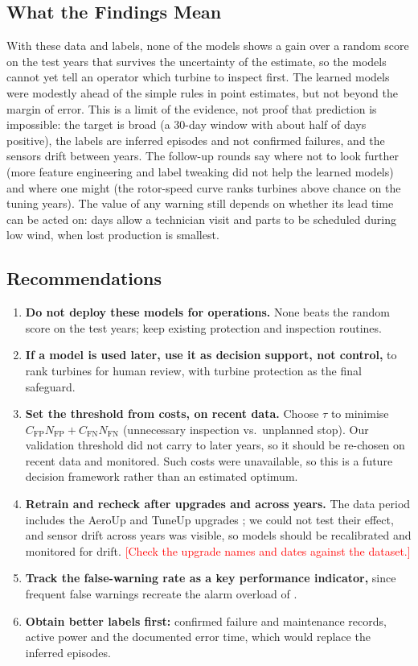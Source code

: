 \documentclass[12pt,a4paper]{article}
\newcommand{\tbc}[1]{\textcolor{red}{[#1]}}
\begin{document}
	\subsection{What the Findings Mean}
	With these data and labels, none of the models shows a gain over a random score on the test years that survives the uncertainty of the estimate, so the models cannot yet tell an operator which turbine to inspect first. The learned models were modestly ahead of the simple rules in point estimates, but not beyond the margin of error. This is a limit of the evidence, not proof that prediction is impossible: the target is broad (a 30-day window with about half of days positive), the labels are inferred episodes and not confirmed failures, and the sensors drift between years. The follow-up rounds say where not to look further (more feature engineering and label tweaking did not help the learned models) and where one might (the rotor-speed curve ranks turbines above chance on the tuning years). The value of any warning still depends on whether its lead time can be acted on: days allow a technician visit and parts to be scheduled during low wind, when lost production is smallest.

	\subsection{Recommendations}
	\begin{enumerate}
		\item \textbf{Do not deploy these models for operations.} None beats the random score on the test years; keep existing protection and inspection routines.
		\item \textbf{If a model is used later, use it as decision support, not control,} to rank turbines for human review, with turbine protection as the final safeguard.
		\item \textbf{Set the threshold from costs, on recent data.} Choose $\tau$ to minimise $C_{\text{FP}}N_{\text{FP}} + C_{\text{FN}}N_{\text{FN}}$ (unnecessary inspection vs.\ unplanned stop). Our validation threshold did not carry to later years, so it should be re-chosen on recent data and monitored. Such costs were unavailable, so this is a future decision framework rather than an estimated optimum.
		\item \textbf{Retrain and recheck after upgrades and across years.} The data period includes the AeroUp and TuneUp upgrades \cite{hot_dataset_v1}; we could not test their effect, and sensor drift across years was visible, so models should be recalibrated and monitored for drift. \tbc{Check the upgrade names and dates against the dataset.}
		\item \textbf{Track the false-warning rate as a key performance indicator,} since frequent false warnings recreate the alarm overload of \cite{qiu2012}.
		\item \textbf{Obtain better labels first:} confirmed failure and maintenance records, active power and the documented error time, which would replace the inferred episodes.
	\end{enumerate}
\end{document}
